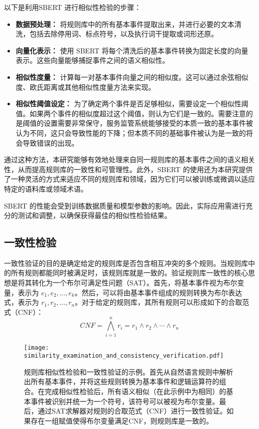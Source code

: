 以下是利用SBERT 进行相似性检验的步骤：
\begin{itemize}
    \item \textbf{数据预处理：} 将规则库中的所有基本事件提取出来，并进行必要的文本清洗，包括去除停用词、标点符号，以及执行词干提取或词形还原。
    \item \textbf{向量化表示：} 使用 SBERT 将每个清洗后的基本事件转换为固定长度的向量表示。这些向量能够捕捉事件之间的语义相似性。
    \item \textbf{相似性度量：} 计算每一对基本事件向量之间的相似度。这可以通过余弦相似度、欧氏距离或其他相似性度量方法来实现。
    \item \textbf{相似性阈值设定：} 为了确定两个事件是否足够相似，需要设定一个相似性阈值。如果两个事件的相似度超过这个阈值，则认为它们是一致的。需要注意的是阈值的设置需要非常保守，服务监管系统能够接受的本质一致的基本事件被认为不同，这只会导致性能的下降；但本质不同的基础事件被认为是一致的将会导致错误的出现。
\end{itemize}

通过这种方法，本研究能够有效地处理来自同一规则库的基本事件之间的语义相关性，从而提高规则库的一致性和可管理性。此外，SBERT 的使用还为本研究提供了一种灵活的方式来适应不同的规则库和领域，因为它们可以被训练或微调以适应特定的语料库或领域术语。

SBERT 的性能会受到训练数据质量和模型参数的影响。因此，实际应用需进行充分的测试和调整，以确保获得最佳的相似性检验结果。

\subsection{一致性检验}

一致性验证的目的是确定给定的规则库是否包含相互冲突的多个规则。当规则库中的所有规则都能同时被满足时，该规则库就是一致的。验证规则库一致性的核心思想是将其转化为一个布尔可满足性问题（SAT）。首先，将基本事件视为布尔变量，表示为 $e_1, e_2, \ldots, e_k$。然后，可以将由基本事件组成的规则转换为布尔表达式，表示为 $r_1, r_2, \ldots, r_n$。对于给定的规则库，其所有规则可以形成如下的合取范式（CNF）：
$$CNF=\bigwedge_{i=1}^{n}r_i=r_1 \land r_2 \land \cdots \land r_n$$

\begin{figure}[!t]
    \centering
    \texttt{[image: similarity\_examination\_and\_consistency\_verification.pdf]}
    \caption{规则库相似性检验和一致性验证的示例。首先从自然语言规则中解析出所有基本事件，并将这些规则转换为基本事件和逻辑运算符的组合。在完成相似性检验后，所有语义相似（在此示例中为相同）的基本事件被识别并统一为一个符号，该符号可以被视为布尔变量。最后，通过SAT求解器对规则的合取范式（CNF）进行一致性验证。如果存在一组赋值使得布尔变量满足CNF，则规则库是一致的。}
    \label{fig_1}
\end{figure}

